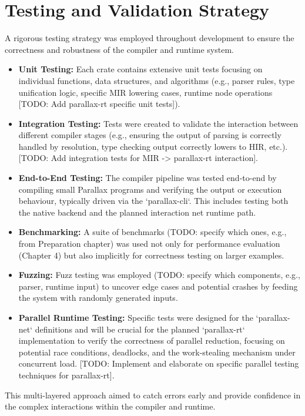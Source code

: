 \section{Testing and Validation Strategy} %
A rigorous testing strategy was employed throughout development to ensure the correctness and robustness of the compiler and runtime system.
\begin{itemize}
    \item \textbf{Unit Testing:} Each crate contains extensive unit tests focusing on individual functions, data structures, and algorithms (e.g., parser rules, type unification logic, specific MIR lowering cases, runtime node operations [TODO: Add parallax-rt specific unit tests]).
    \item \textbf{Integration Testing:} Tests were created to validate the interaction between different compiler stages (e.g., ensuring the output of parsing is correctly handled by resolution, type checking output correctly lowers to HIR, etc.). [TODO: Add integration tests for MIR -> parallax-rt interaction].
    \item \textbf{End-to-End Testing:} The compiler pipeline was tested end-to-end by compiling small Parallax programs and verifying the output or execution behaviour, typically driven via the `parallax-cli`. This includes testing both the native backend and the planned interaction net runtime path.
    \item \textbf{Benchmarking:} A suite of benchmarks (TODO: specify which ones, e.g., from Preparation chapter) was used not only for performance evaluation (Chapter 4) but also implicitly for correctness testing on larger examples.
    \item \textbf{Fuzzing:} Fuzz testing was employed (TODO: specify which components, e.g., parser, runtime input) to uncover edge cases and potential crashes by feeding the system with randomly generated inputs.
    \item \textbf{Parallel Runtime Testing:} Specific tests were designed for the `parallax-net` definitions and will be crucial for the planned `parallax-rt` implementation to verify the correctness of parallel reduction, focusing on potential race conditions, deadlocks, and the work-stealing mechanism under concurrent load. [TODO: Implement and elaborate on specific parallel testing techniques for parallax-rt].
\end{itemize}
This multi-layered approach aimed to catch errors early and provide confidence in the complex interactions within the compiler and runtime.

